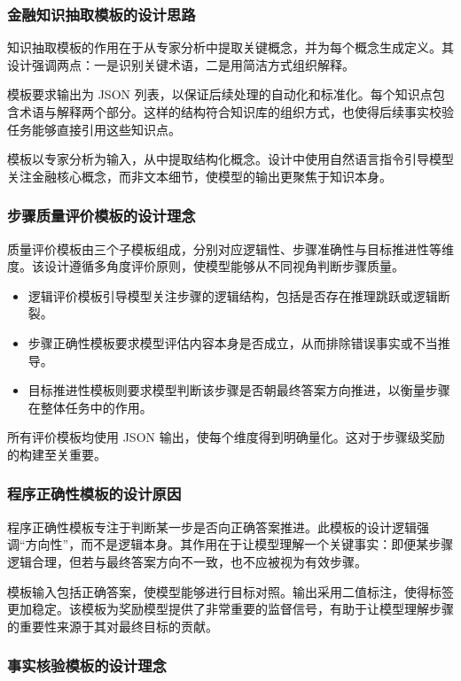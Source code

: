 \documentclass[professional,privacy,print,win,long,STEM,AutoFakeBold]{def/buaa}
\begin{document}
\subsubsection{金融知识抽取模板的设计思路}

知识抽取模板的作用在于从专家分析中提取关键概念，并为每个概念生成定义。其设计强调两点：一是识别关键术语，二是用简洁方式组织解释。

模板要求输出为 JSON 列表，以保证后续处理的自动化和标准化。每个知识点包含术语与解释两个部分。这样的结构符合知识库的组织方式，也使得后续事实校验任务能够直接引用这些知识点。

模板以专家分析为输入，从中提取结构化概念。设计中使用自然语言指令引导模型关注金融核心概念，而非文本细节，使模型的输出更聚焦于知识本身。

\subsubsection{步骤质量评价模板的设计理念}

质量评价模板由三个子模板组成，分别对应逻辑性、步骤准确性与目标推进性等维度。该设计遵循多角度评价原则，使模型能够从不同视角判断步骤质量。

\begin{itemize}
    \item 逻辑评价模板引导模型关注步骤的逻辑结构，包括是否存在推理跳跃或逻辑断裂。
    \item 步骤正确性模板要求模型评估内容本身是否成立，从而排除错误事实或不当推导。
    \item 目标推进性模板则要求模型判断该步骤是否朝最终答案方向推进，以衡量步骤在整体任务中的作用。
\end{itemize}

所有评价模板均使用 JSON 输出，使每个维度得到明确量化。这对于步骤级奖励的构建至关重要。

\subsubsection{程序正确性模板的设计原因}

程序正确性模板专注于判断某一步是否向正确答案推进。此模板的设计逻辑强调“方向性”，而不是逻辑本身。其作用在于让模型理解一个关键事实：即便某步骤逻辑合理，但若与最终答案方向不一致，也不应被视为有效步骤。

模板输入包括正确答案，使模型能够进行目标对照。输出采用二值标注，使得标签更加稳定。该模板为奖励模型提供了非常重要的监督信号，有助于让模型理解步骤的重要性来源于其对最终目标的贡献。

\subsubsection{事实核验模板的设计理念}
\end{document}
